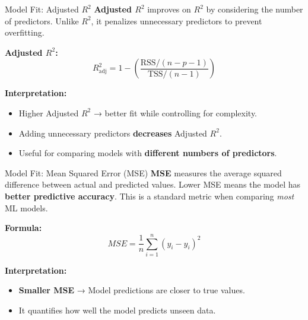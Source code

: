 \documentclass[aspectratio=169,xcolor=dvipsnames]{beamer}
\begin{document}
\begin{frame}{Model Fit: Adjusted \( R^2 \)}
\textbf{Adjusted \( R^2 \)} improves on \( R^2 \) by considering the number of predictors. Unlike \( R^2 \), it penalizes unnecessary predictors to prevent overfitting.

    \bigskip

    \textbf{Adjusted \( R^2 \):}
    \begin{equation}
        R^2_{\text{adj}} = 1 - \left( \frac{\text{RSS} / (n - p - 1)}{\text{TSS} / (n - 1)} \right)
    \end{equation}

    \bigskip

    \textbf{Interpretation:}
    \begin{itemize}
        \item Higher Adjusted \( R^2 \) → better fit while controlling for complexity.
        \item Adding unnecessary predictors \textbf{decreases} Adjusted \( R^2 \).
        \item Useful for comparing models with \textbf{different numbers of predictors}.
    \end{itemize}
\end{frame}


\begin{frame}{Model Fit: Mean Squared Error (MSE)}
\textbf{MSE} measures the average squared difference between actual and predicted values. Lower MSE means the model has \textbf{better predictive accuracy}. This is a standard metric when comparing \textit{most} ML models.

    \bigskip

    \textbf{Formula:}
    \begin{equation}
        MSE = \frac{1}{n} \sum_{i=1}^{n} (y_i - \hat{y}_i)^2
    \end{equation}

    \bigskip

    \textbf{Interpretation:}
    \begin{itemize}
    	\item \textbf{Smaller MSE} → Model predictions are closer to true values.
        \item It quantifies how well the model predicts unseen data.
    \end{itemize}
\end{frame}
\end{document}
